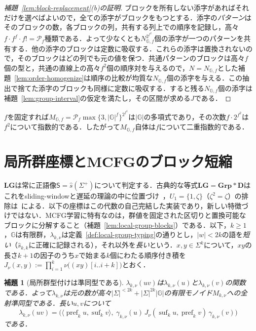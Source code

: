 \documentclass[11pt,a4paper]{ltjsarticle}
\numberwithin{equation}{section}
\theoremstyle{plain}
\newtheorem{lemma}[theorem]{補題}
\theoremstyle{definition}
\theoremstyle{remark}
\begin{document}
\begin{proof}[補題~\ref{lem:block-replacement}(b)の証明]
ブロックを所有しない添字があればそれだけを選べばよいので，全ての添字がブロックをもつとする．添字の\emph{パターン}はそのブロックの数，各ブロックの列，共有する列上での順序を記録し，高々$f\cdot f^f\cdot f!=\mathcal P_f$種類である．よって少なくとも$N_{{\mathbb G},f}^{2^{f^2}}$個の添字が一つのパターンを共有する．他の添字のブロックは定数に吸収する．これらの添字は置換されないので，そのブロックはどの列でも元の値を保つ．共通パターンのブロックは高々$f$個の型と，共通の直線上の高々$f^2$個の順序対を与えるので，$N=N_{{\mathbb G},f}$とした補題~\ref{lem:order-homogenize}は順序の比較が均質な$N_{{\mathbb G},f}$個の添字を与える．この抽出で捨てた添字のブロックも同様に定数に吸収する．すると残る$N_{{\mathbb G},f}$個の添字は補題~\ref{lem:group-interval}の仮定を満たし，その区間が求める$J$である．
\end{proof}

$f$を固定すれば$M_{{\mathbb G},f}=\mathcal P_f\max\{3,|{\mathbb G}|^f\}^{2^{f^2}}$は$|{\mathbb G}|$の多項式であり，その次数$f\cdot2^{f^2}$は$f^2$について指数的である．したがって$M_{{\mathbb G},f}$自体は$f$について二重指数的である．

\section{局所群座標とMCFGのブロック短縮}
\label{app:local-group}

$\mathbf{LG}$は常に正語像$\mathsf S=\widehat s(\Sigma^+)$について判定する．古典的な等式$\mathbf{LG}=\mathbf{Grp}*\mathbf D$はこれをsliding-windowと遅延の理論の中に位置づけ~\cite{Straubing1985,Tilson1987}，$U_1=\{1,\zeta\}$（$\zeta^2=\zeta$）の排除は~\cite[Proposition~2.3]{AlmeidaEtAl2009}による．以下の座標はこの代数の自己完結した実装であり，新しい特徴づけではない．MCFG学習に特有なのは，群値を固定された区切りと置換可能なブロックに分解すること（補題~\ref{lem:local-group-blocks}）である．以下，$k\ge1$，${\mathbb G}$は有限群，$\lambda_{k,\nu}$は定義~\ref{def:local-group-typing}の通りとし，$|w|<2k$の語を\emph{短い}（$\widehat s_{k,k}$に正確に記録される），それ以外を\emph{長い}という．$x,y\in\Sigma^k$について，$xy$の長さ$k+1$の因子のうち$x$で始まる$k$個にわたる順序付き積を$J_\nu(x,y):=\prod_{i=1}^{k}\nu\bigl((xy)[i..i+k]\bigr)$とおく．

\begin{lemma}[局所群型付けは準同型である]
\label{lem:local-group-morphism}
$\lambda_{k,\nu}(uv)$は$\lambda_{k,\nu}(u)$と$\lambda_{k,\nu}(v)$の関数である．よって$\lambda_{k,\nu}$は元の数が高々$|\Sigma|^{<2k}+|\Sigma|^{2k}|{\mathbb G}|$の有限モノイド$M_{k,\nu}$への全射準同型である．長い$u,v$について
\[
 \lambda_{k,\nu}(uv)
 =\bigl(\langle\operatorname{pref}_ku,\operatorname{suf}_kv\rangle,\;
   \gamma_{k,\nu}(u)\,J_\nu(\operatorname{suf}_ku,\operatorname{pref}_kv)\,
   \gamma_{k,\nu}(v)\bigr)
\]
である．
\end{lemma}
\end{document}
